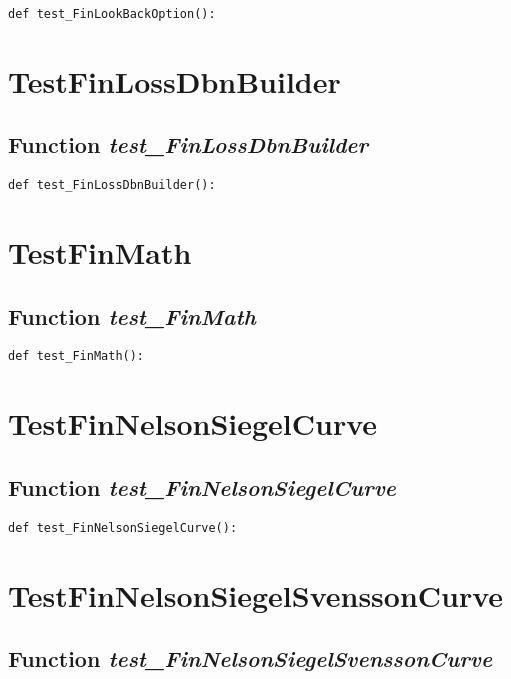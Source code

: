 \documentclass[twoside,11pt]{book}
\begin{document}
\begin{lstlisting}
def test_FinLookBackOption():
\end{lstlisting}


\newpage
\section{TestFinLossDbnBuilder}

\subsection{Function {\it test\_FinLossDbnBuilder}}


\begin{lstlisting}
def test_FinLossDbnBuilder():
\end{lstlisting}


\newpage
\section{TestFinMath}

\subsection{Function {\it test\_FinMath}}


\begin{lstlisting}
def test_FinMath():
\end{lstlisting}


\newpage
\section{TestFinNelsonSiegelCurve}

\subsection{Function {\it test\_FinNelsonSiegelCurve}}


\begin{lstlisting}
def test_FinNelsonSiegelCurve():
\end{lstlisting}


\newpage
\section{TestFinNelsonSiegelSvenssonCurve}

\subsection{Function {\it test\_FinNelsonSiegelSvenssonCurve}}
\end{document}
